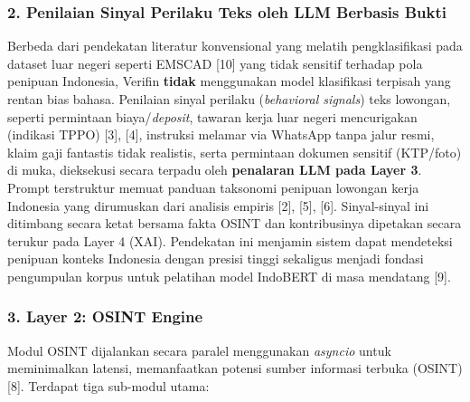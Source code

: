\documentclass[12pt,a4paper]{article}
\begin{document}
\subsubsection*{2. Penilaian Sinyal Perilaku Teks oleh LLM Berbasis Bukti}
{}

Berbeda dari pendekatan literatur konvensional yang melatih pengklasifikasi pada dataset
luar negeri seperti EMSCAD [10] yang tidak sensitif terhadap pola penipuan Indonesia, Verifin
\textbf{tidak} menggunakan model klasifikasi terpisah yang rentan bias bahasa. Penilaian sinyal perilaku
(\textit{behavioral signals}) teks lowongan, seperti permintaan biaya/\textit{deposit},
tawaran kerja luar negeri mencurigakan (indikasi TPPO) [3], [4], instruksi melamar via WhatsApp tanpa jalur resmi,
klaim gaji fantastis tidak realistis, serta permintaan dokumen sensitif (KTP/foto) di muka, dieksekusi secara terpadu oleh
\textbf{penalaran LLM pada Layer 3}. Prompt terstruktur memuat panduan taksonomi penipuan lowongan kerja
Indonesia yang dirumuskan dari analisis empiris [2], [5], [6]. Sinyal-sinyal ini ditimbang secara ketat bersama
fakta OSINT dan kontribusinya dipetakan secara terukur pada Layer 4 (XAI). Pendekatan ini menjamin sistem
dapat mendeteksi penipuan konteks Indonesia dengan presisi tinggi sekaligus menjadi fondasi pengumpulan
korpus untuk pelatihan model IndoBERT di masa mendatang [9].

\subsubsection*{3. Layer 2: OSINT Engine}

Modul OSINT dijalankan secara paralel menggunakan \textit{asyncio} untuk meminimalkan latensi, memanfaatkan potensi sumber informasi terbuka (OSINT) [8].
Terdapat tiga sub-modul utama:
\end{document}
